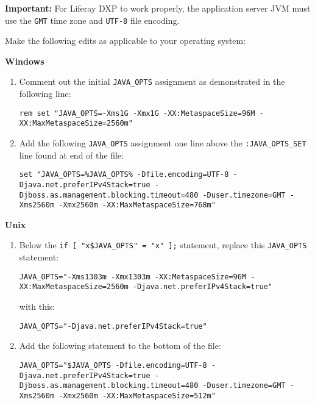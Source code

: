 \noindent\hrulefill

\textbf{Important:} For Liferay DXP to work properly, the application
server JVM must use the \texttt{GMT} time zone and \texttt{UTF-8} file
encoding.

\noindent\hrulefill

Make the following edits as applicable to your operating system:

\textbf{Windows}

\begin{enumerate}
\def\labelenumi{\arabic{enumi}.}
\item
  Comment out the initial \texttt{JAVA\_OPTS} assignment as demonstrated
  in the following line:

\begin{verbatim}
rem set "JAVA_OPTS=-Xms1G -Xmx1G -XX:MetaspaceSize=96M -XX:MaxMetaspaceSize=2560m"
\end{verbatim}
\item
  Add the following \texttt{JAVA\_OPTS} assignment one line above the
  \texttt{:JAVA\_OPTS\_SET} line found at end of the file:

\begin{verbatim}
set "JAVA_OPTS=%JAVA_OPTS% -Dfile.encoding=UTF-8 -Djava.net.preferIPv4Stack=true -Djboss.as.management.blocking.timeout=480 -Duser.timezone=GMT -Xms2560m -Xmx2560m -XX:MaxMetaspaceSize=768m"
\end{verbatim}
\end{enumerate}

\textbf{Unix}

\begin{enumerate}
\def\labelenumi{\arabic{enumi}.}
\item
  Below the \texttt{if\ {[}\ "x\$JAVA\_OPTS"\ =\ "x"\ {]};} statement,
  replace this \texttt{JAVA\_OPTS} statement:

\begin{verbatim}
JAVA_OPTS="-Xms1303m -Xmx1303m -XX:MetaspaceSize=96M -XX:MaxMetaspaceSize=2560m -Djava.net.preferIPv4Stack=true"
\end{verbatim}

  with this:

\begin{verbatim}
JAVA_OPTS="-Djava.net.preferIPv4Stack=true"
\end{verbatim}
\item
  Add the following statement to the bottom of the file:

\begin{verbatim}
JAVA_OPTS="$JAVA_OPTS -Dfile.encoding=UTF-8 -Djava.net.preferIPv4Stack=true -Djboss.as.management.blocking.timeout=480 -Duser.timezone=GMT -Xms2560m -Xmx2560m -XX:MaxMetaspaceSize=512m"
\end{verbatim}
\end{enumerate}

